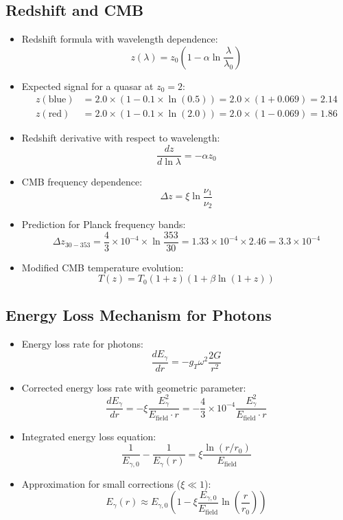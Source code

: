 \documentclass[12pt,a4paper]{article}
\begin{document}
	\subsection{Redshift and CMB}
	\begin{itemize}
		\item Redshift formula with wavelength dependence:
		$$z(\lambda) = z_0\left(1 - \alpha \ln\frac{\lambda}{\lambda_0}\right)$$
		
		\item Expected signal for a quasar at $z_0 = 2$:
		\begin{align*}
			z(\text{blue}) &= 2.0 \times (1 - 0.1 \times \ln(0.5)) = 2.0 \times (1 + 0.069) = 2.14\\
			z(\text{red}) &= 2.0 \times (1 - 0.1 \times \ln(2.0)) = 2.0 \times (1 - 0.069) = 1.86
		\end{align*}
		
		\item Redshift derivative with respect to wavelength:
		$$\frac{dz}{d\ln\lambda} = -\alpha z_0$$
		
		\item CMB frequency dependence:
		$$\Delta z = \xi \ln\frac{\nu_1}{\nu_2}$$
		
		\item Prediction for Planck frequency bands:
		$$\Delta z_{30-353} = \frac{4}{3} \times 10^{-4} \times \ln\frac{353}{30} = 1.33 \times 10^{-4} \times 2.46 = 3.3 \times 10^{-4}$$
		
		\item Modified CMB temperature evolution:
		$$\boxed{T(z) = T_0(1+z)\left(1 + \beta \ln(1+z)\right)}$$
	\end{itemize}
	
	\subsection{Energy Loss Mechanism for Photons}
	\begin{itemize}
		\item Energy loss rate for photons:
		$$\frac{dE_\gamma}{dr} = -g_T \omega^2 \frac{2G}{r^2}$$
		
		\item Corrected energy loss rate with geometric parameter:
		$$\boxed{\frac{dE_\gamma}{dr} = -\xi \frac{E_\gamma^2}{E_{\text{field}} \cdot r} = -\frac{4}{3} \times 10^{-4} \frac{E_\gamma^2}{E_{\text{field}} \cdot r}}$$
		
		\item Integrated energy loss equation:
		$$\frac{1}{E_{\gamma,0}} - \frac{1}{E_\gamma(r)} = \xi \frac{\ln(r/r_0)}{E_{\text{field}}}$$
		
		\item Approximation for small corrections ($\xi \ll 1$):
		$$E_\gamma(r) \approx E_{\gamma,0} \left(1 - \xi \frac{E_{\gamma,0}}{E_{\text{field}}} \ln\left(\frac{r}{r_0}\right)\right)$$
	\end{itemize}
	
\end{document}
